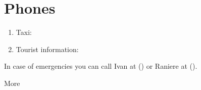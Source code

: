 \documentclass[12pt]{article}
\begin{document}
\vspace*{1cm}

\clearpage

\NoBgThispage

\section*{Phones}

\begin{enumerate}
  \item Taxi:
  \item Tourist information:
\end{enumerate}

In case of emergencies you can call Ivan at () or Raniere at ().

\clearpage

\NoBgThispage

More

\clearpage

\BgThispage

\vspace*{1cm}
\end{document}
